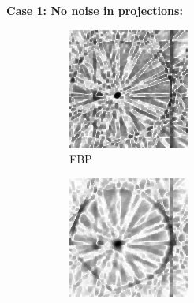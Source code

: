 \documentclass{article}
\begin{document}
\newpage
\textbf{Case 1: No noise in projections:}
\begin{figure}[!h]
    \begin{subfigure}[b]{0.19\linewidth}
        \includegraphics[width=\textwidth]{../images/potato/artefacts/no_noise/weightsIm_fbp30.png}
\captionsetup{labelformat=empty}       
 \caption{FBP}
    \end{subfigure}
    \begin{subfigure}[b]{0.2\linewidth}
        \includegraphics[width=\textwidth]{../images/potato/artefacts/no_noise/weightsIm_sirt30.png}

\end{subfigure}
\end{figure}
\end{document}
